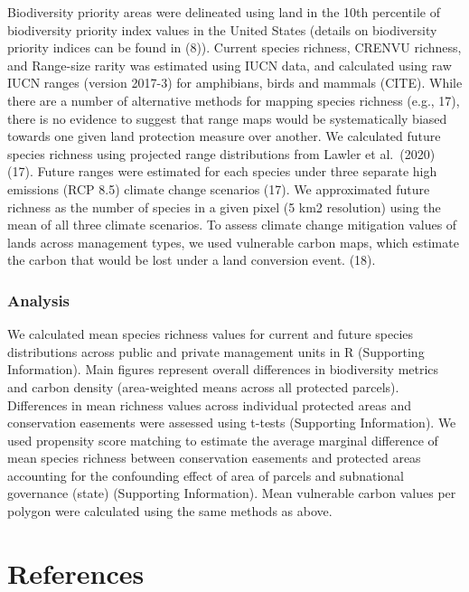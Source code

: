 \documentclass[3p]{elsarticle} %
\begin{document}
Biodiversity priority areas were delineated using land in the 10th
percentile of biodiversity priority index values in the United States
(details on biodiversity priority indices can be found in (8)). Current
species richness, CRENVU richness, and Range-size rarity was estimated
using IUCN data, and calculated using raw IUCN ranges (version 2017-3)
for amphibians, birds and mammals (CITE). While there are a number of
alternative methods for mapping species richness (e.g., 17), there is no
evidence to suggest that range maps would be systematically biased
towards one given land protection measure over another. We calculated
future species richness using projected range distributions from Lawler
et al.~(2020) (17). Future ranges were estimated for each species under
three separate high emissions (RCP 8.5) climate change scenarios (17).
We approximated future richness as the number of species in a given
pixel (5 km2 resolution) using the mean of all three climate scenarios.
To assess climate change mitigation values of lands across management
types, we used vulnerable carbon maps, which estimate the carbon that
would be lost under a land conversion event. (18).

\hypertarget{analysis}{%
\subsubsection{Analysis}\label{analysis}}

We calculated mean species richness values for current and future
species distributions across public and private management units in R
(Supporting Information). Main figures represent overall differences in
biodiversity metrics and carbon density (area-weighted means across all
protected parcels). Differences in mean richness values across
individual protected areas and conservation easements were assessed
using t-tests (Supporting Information). We used propensity score
matching to estimate the average marginal difference of mean species
richness between conservation easements and protected areas accounting
for the confounding effect of area of parcels and subnational governance
(state) (Supporting Information). Mean vulnerable carbon values per
polygon were calculated using the same methods as above.

\hypertarget{references}{%
\section*{References}\label{references}}
\end{document}
